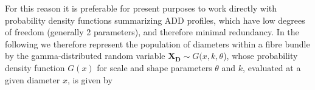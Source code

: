 For this reason it is preferable for present purposes to work directly with probability density functions summarizing ADD profiles, which have low degrees of freedom (generally 2 parameters), and therefore minimal redundancy. In the following we therefore represent the population of diameters within a fibre bundle by the gamma-distributed random variable $\mathbf{X_D} \sim G(x,k,\theta$), whose probability density function $G(x)$ for scale and shape parameters $\theta$ and $k$, evaluated at a given diameter $x$, is given by 